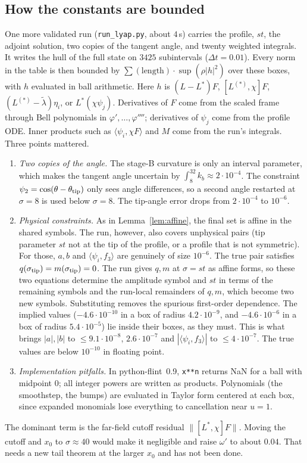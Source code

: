 \documentclass[11pt]{amsart}
\theoremstyle{definition}
\theoremstyle{remark}
\newcommand{\ip}[2]{\langle #1,#2\rangle}
\newcommand{\stip}{\sigma_{\rm tip}}
\begin{document}
\subsection*{How the constants are bounded}
One more validated run (\texttt{run\_lyap.py}, about $4$\,s) carries the profile, $st$, the adjoint solution, two copies of the tangent angle, and twenty weighted integrals. It writes the hull of the full state on $3425$ subintervals ($\Delta t=0.01$). Every norm in the table is then bounded by $\sum(\text{length})\cdot\sup(\rho|h|^2)$ over these boxes, with $h$ evaluated in ball arithmetic. Here $h$ is $(L-L^*)F$, $[L^{(*)},\chi]F$, $(L^{(*)}-\tilde\lambda)\eta_i$, or $L^*(\chi\psi_j)$. Derivatives of $F$ come from the scaled frame through Bell polynomials in $\varphi',\dots,\varphi''''$; derivatives of $\psi_j$ come from the profile ODE. Inner products such as $\ip{\psi_i}{\chi F}$ and $M$ come from the run's integrals. Three points mattered.
\begin{enumerate}
\item \emph{Two copies of the angle.} The stage-B curvature is only an interval parameter, which makes the tangent angle uncertain by $\int_8^{32}k_b\approx2\cdot10^{-4}$. The constraint $\psi_2=\cos(\theta-\theta_{\rm tip})$ only sees angle differences, so a second angle restarted at $\sigma=8$ is used below $\sigma=8$. The tip-angle error drops from $2\cdot10^{-4}$ to $10^{-6}$.
\item \emph{Physical constraints.} As in Lemma~\ref{lem:affine}, the final set is affine in the shared symbols. The run, however, also covers unphysical pairs (tip parameter $st$ not at the tip of the profile, or a profile that is not symmetric). For those, $a,b$ and $\ip{\psi_i}{f_3}$ are genuinely of size $10^{-6}$. The true pair satisfies $q(\stip)=m(\stip)=0$. The run gives $q,m$ at $\sigma=st$ as affine forms, so these two equations determine the amplitude symbol and $st$ in terms of the remaining symbols and the run-local remainders of $q,m$, which become two new symbols. Substituting removes the spurious first-order dependence. The implied values ($-4.6\cdot10^{-10}$ in a box of radius $4.2\cdot10^{-9}$, and $-4.6\cdot10^{-6}$ in a box of radius $5.4\cdot10^{-5}$) lie inside their boxes, as they must. This is what brings $|a|,|b|$ to $\le9.1\cdot10^{-8},\,2.6\cdot10^{-7}$ and $|\ip{\psi_i}{f_3}|$ to $\le4\cdot10^{-7}$. The true values are below $10^{-10}$ in floating point.
\item \emph{Implementation pitfalls.} In python-flint~0.9, \verb|x**n| returns NaN for a ball with midpoint $0$; all integer powers are written as products. Polynomials (the smoothstep, the bumps) are evaluated in Taylor form centered at each box, since expanded monomials lose everything to cancellation near $u=1$.
\end{enumerate}
The dominant term is the far-field cutoff residual $\|[L^*,\chi]F\|$. Moving the cutoff and $x_0$ to $\sigma\approx40$ would make it negligible and raise $\omega'$ to about $0.04$. That needs a new tail theorem at the larger $x_0$ and has not been done.
\end{document}
